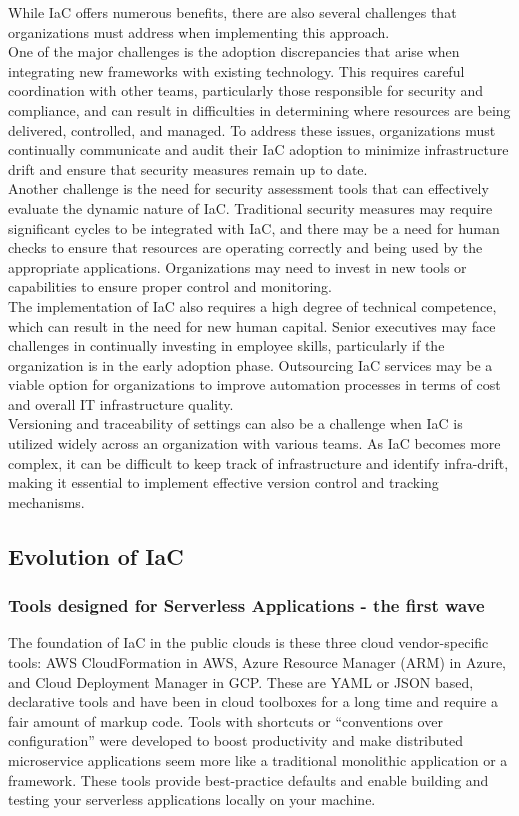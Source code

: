 While IaC offers numerous benefits, there are also several challenges that organizations must address when implementing this approach.\\
One of the major challenges is the adoption discrepancies that arise when integrating new frameworks with existing technology. This requires careful coordination with other teams, particularly those responsible for security and compliance, and can result in difficulties in determining where resources are being delivered, controlled, and managed. To address these issues, organizations must continually communicate and audit their IaC adoption to minimize infrastructure drift and ensure that security measures remain up to date.\\
Another challenge is the need for security assessment tools that can effectively evaluate the dynamic nature of IaC. Traditional security measures may require significant cycles to be integrated with IaC, and there may be a need for human checks to ensure that resources are operating correctly and being used by the appropriate applications. Organizations may need to invest in new tools or capabilities to ensure proper control and monitoring.\\
The implementation of IaC also requires a high degree of technical competence, which can result in the need for new human capital. Senior executives may face challenges in continually investing in employee skills, particularly if the organization is in the early adoption phase. Outsourcing IaC services may be a viable option for organizations to improve automation processes in terms of cost and overall IT infrastructure quality.\\
Versioning and traceability of settings can also be a challenge when IaC is utilized widely across an organization with various teams. As IaC becomes more complex, it can be difficult to keep track of infrastructure and identify infra-drift, making it essential to implement effective version control and tracking mechanisms.\\





\subsection{Evolution of IaC}

\subsubsection{Tools designed for Serverless Applications - the first wave}
The foundation of IaC in the public clouds is these three cloud vendor-specific tools: AWS CloudFormation in \gls{AWS}, \gls{Azure Resource Manager} (ARM) in \gls{Azure}, and \gls{Cloud Deployment Manager} in \gls{GCP}.
These are YAML or JSON based, declarative tools and have been in cloud toolboxes for a long time and require a fair amount of markup code.
Tools with shortcuts or “conventions over configuration” were developed to boost productivity and make distributed microservice applications seem more like a traditional monolithic application or a framework.
These tools provide best-practice defaults and enable building and testing your serverless applications locally on your machine.
